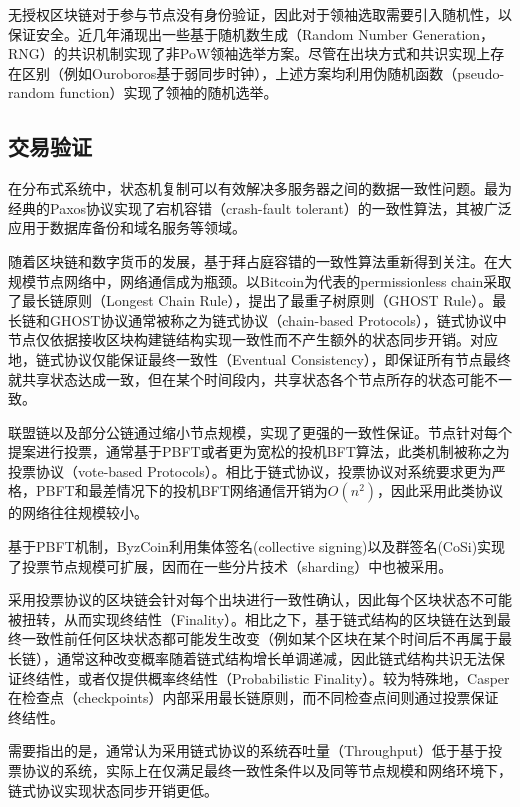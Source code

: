 无授权区块链对于参与节点没有身份验证，因此对于领袖选取需要引入随机性，以保证安全\cite{pass2017rethinking}。近几年涌现出一些基于随机数生成（Random Number Generation，RNG）的共识机制实现了非PoW领袖选举方案\cite{gilad2017algorand,david2018ouroboros,hanke2018difinity}。尽管在出块方式和共识实现上存在区别（例如Ouroboros基于弱同步时钟），上述方案均利用伪随机函数（pseudo-random function）实现了领袖的随机选举。


\subsection{交易验证}
\label{subsec:intro_tx_verification}
在分布式系统中，状态机复制可以有效解决多服务器之间的数据一致性问题\cite{schneider1990implementing}。最为经典的Paxos协议实现了宕机容错（crash-fault tolerant）的一致性算法\cite{lamport2001paxos}，其被广泛应用于数据库备份和域名服务等领域\cite{burrows2006chubby,chang2008bigtable}。

随着区块链和数字货币的发展，基于拜占庭容错的一致性算法重新得到关注。在大规模节点网络中，网络通信成为瓶颈。以Bitcoin为代表的permissionless chain采取了最长链原则（Longest Chain Rule）\cite{nakamoto2008bitcoin}，\cite{sompolinsky2015secure}提出了最重子树原则（GHOST Rule）。最长链和GHOST协议通常被称之为链式协议（chain-based Protocols），链式协议中节点仅依据接收区块构建链结构实现一致性而不产生额外的状态同步开销。对应地，链式协议仅能保证最终一致性（Eventual Consistency），即保证所有节点最终就共享状态达成一致，但在某个时间段内，共享状态各个节点所存的状态可能不一致。

联盟链以及部分公链通过缩小节点规模，实现了更强的一致性保证。节点针对每个提案进行投票，通常基于PBFT\cite{castro1999practical}或者更为宽松的投机BFT算法\cite{kotla2007zyzzyva}，此类机制被称之为投票协议（vote-based Protocols）。相比于链式协议，投票协议对系统要求更为严格，PBFT和最差情况下的投机BFT网络通信开销为$O(n^2)$，因此采用此类协议的网络往往规模较小。

基于PBFT机制，ByzCoin\cite{kogias2016enhancing}利用集体签名(collective signing)以及群签名(CoSi)实现了投票节点规模可扩展，因而在一些分片技术（sharding）中也被采用\cite{kokoris2018omniledger}。

采用投票协议的区块链会针对每个出块进行一致性确认，因此每个区块状态不可能被扭转，从而实现终结性（Finality）。相比之下，基于链式结构的区块链在达到最终一致性前任何区块状态都可能发生改变（例如某个区块在某个时间后不再属于最长链），通常这种改变概率随着链式结构增长单调递减\cite{nakamoto2008bitcoin}，因此链式结构共识无法保证终结性，或者仅提供概率终结性（Probabilistic Finality）。较为特殊地，Casper\cite{buterin2017casper}在检查点（checkpoints）内部采用最长链原则，而不同检查点间则通过投票保证终结性。

需要指出的是，通常认为采用链式协议的系统吞吐量（Throughput）低于基于投票协议的系统，实际上在仅满足最终一致性条件以及同等节点规模和网络环境下，链式协议实现状态同步开销更低。








